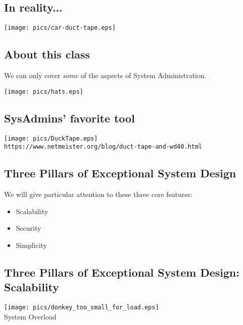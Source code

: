 \documentclass[xga]{xdvislides}
\begin{document}
\subsection{In reality...}
\vspace*{\fill}
\begin{center}
    \texttt{[image: pics/car-duct-tape.eps]}
\end{center}
\vspace*{\fill}

\subsection{About this class}
We can only cover {\em some} of the aspects of System Administration.
\vspace*{\fill}
\begin{center}
	\texttt{[image: pics/hats.eps]}
\Normalsize
\end{center}
\vspace*{\fill}

\subsection{SysAdmins' favorite tool}
\begin{center}
	\texttt{[image: pics/DuckTape.eps]} \\
	\vspace{.5in}
	\small
	\verb+https://www.netmeister.org/blog/duct-tape-and-wd40.html+
	\Normalsize
\end{center}

\subsection{Three Pillars of Exceptional System Design}
We will give particular attention to these three core features:
\begin{itemize}
	\item Scalability
	\item Security
	\item Simplicity
\end{itemize}

\subsection{Three Pillars of Exceptional System Design: Scalability}
\vspace*{\fill}
\begin{center}
    \texttt{[image: pics/donkey\_too\_small\_for\_load.eps]} \\
	System Overload
\end{center}
\vspace*{\fill}
\end{document}
